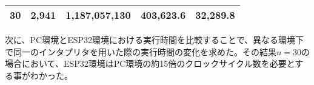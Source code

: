 \begin{table}[htbp]
\begin{center}
\begin{tabular}{rrrrr}
      30 & 2,941 & 1,187,057,130 & 403,623.6 & 32,289.8 \\ \hline
    \end{tabular}
  \end{center}
\end{table}

次に、PC環境とESP32環境における実行時間を比較することで、異なる環境下で同一のインタプリタを用いた際の実行時間の変化を求めた。その結果$n=30$の場合において、ESP32環境はPC環境の約15倍のクロックサイクル数を必要とする事がわかった。


